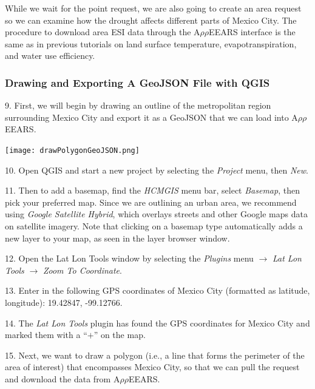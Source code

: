\documentclass[oneside,a4paper,11pt,explicit]{book}
\begin{document}
While we wait for the point request, we are also going to create an area request so we can examine how the drought affects different parts of Mexico City. The procedure to download area ESI data through the A$\rho\rho$EEARS interface is the same as in previous tutorials on land surface temperature, evapotranspiration, and water use efficiency.

\subsubsection{Drawing and Exporting A GeoJSON File with QGIS}

9. First, we will begin by drawing an outline of the metropolitan region surrounding Mexico City and export it as a GeoJSON that we can load into A$\rho\rho$EEARS. 

\vspace{.5em}

\centerline{\texttt{[image: drawPolygonGeoJSON.png]}}

\vspace{.5em}

10. Open QGIS and start a new project by selecting the \textit{Project} menu, then \textit{New}.

11. Then to add a basemap, find the \textit{HCMGIS} menu bar, select \textit{Basemap}, then pick your preferred map. Since we are outlining an urban area, we recommend using \textit{Google Satellite Hybrid}, which overlays streets and other Google maps data on satellite imagery. Note that clicking on a basemap type automatically adds a new layer to your map, as seen in the layer browser window.

12. Open the Lat Lon Tools window by selecting the \textit{Plugins} menu $\rightarrow$ \textit{Lat Lon Tools} $\rightarrow$ \textit{Zoom To Coordinate}.
	
13. Enter in the following GPS coordinates of Mexico City (formatted as latitude, longitude): 19.42847, -99.12766.
	
14. The \textit{Lat Lon Tools} plugin has found the GPS coordinates for Mexico City and marked them with a ``$+$'' on the map. 

15. Next, we want to draw a polygon (i.e., a line that forms the perimeter of the area of interest) that encompasses Mexico City, so that we can pull the request and download the data from A$\rho\rho$EEARS.
	
\end{document}
